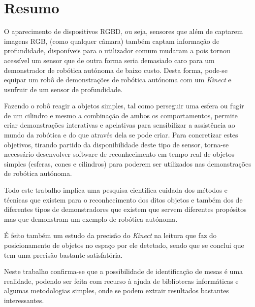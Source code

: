 \chapter{Resumo}

O aparecimento de dispositivos RGBD, ou seja, sensores que além de captarem imagens RGB,
(como qualquer câmara) também captam informação de profundidade, disponíveis para o utilizador
comum mudaram a pois tornou acessível um sensor que de outra forma seria demasiado caro
para um demonstrador de robótica autónoma de baixo custo. Desta forma, pode-se equipar um robô de demonstrações de robótica autónoma com um \emph{Kinect} e usufruir de um sensor de profundidade.

Fazendo o robô reagir a objetos simples, tal como perseguir uma esfera ou
fugir de um cilindro e mesmo a combinação de ambos os comportamentos, permite 
criar demonstrações interativas e apelativas para sensibilizar a assistência 
ao mundo da robótica e do que através dela se pode criar. Para concretizar estes objetivos,
tirando partido da disponibilidade deste tipo de sensor, torna-se necessário desenvolver 
software de reconhecimento em tempo real de objetos simples (esferas, cones
e cilindros) para poderem ser utilizados nas demonstrações de robótica
autónoma. 

Todo este trabalho implica uma pesquisa científica cuidada dos métodos e técnicas
que existem para o reconhecimento dos ditos objetos e também dos de diferentes tipos
de demonstradores que existem que servem diferentes propósitos mas que demonstram
um exemplo de robótica autónoma.

É feito também um estudo da precisão do \emph{Kinect} na leitura que faz do posicionamento de objetos no espaço por ele detetado, sendo que se conclui que tem uma precisão bastante satisfatória.

Neste trabalho confirma-se que a possibilidade de identificação de mesas é uma realidade, podendo ser feita com recurso à ajuda de bibliotecas informáticas e algumas metodologias simples, onde se podem extrair resultados bastantes interessantes.




